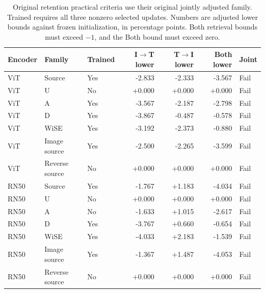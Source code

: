 \begin{table}[t]
\centering
\small
\setlength{\tabcolsep}{3pt}
\begin{tabular}{lllrrrl}
\toprule
Encoder & Family & Trained & I$\to$T lower & T$\to$I lower & Both lower & Joint\\
\midrule
ViT & Source & Yes & -2.833 & -2.333 & -3.567 & Fail\\
ViT & U & No & +0.000 & +0.000 & +0.000 & Fail\\
ViT & A & Yes & -3.567 & -2.187 & -2.798 & Fail\\
ViT & D & Yes & -3.867 & -0.487 & -0.578 & Fail\\
ViT & WiSE & Yes & -3.192 & -2.373 & -0.880 & Fail\\
ViT & Image source & Yes & -2.500 & -2.265 & -3.599 & Fail\\
ViT & Reverse source & No & +0.000 & +0.000 & +0.000 & Fail\\
RN50 & Source & Yes & -1.767 & +1.183 & -4.034 & Fail\\
RN50 & U & No & +0.000 & +0.000 & +0.000 & Fail\\
RN50 & A & No & -1.633 & +1.015 & -2.617 & Fail\\
RN50 & D & Yes & -3.767 & +0.660 & -0.654 & Fail\\
RN50 & WiSE & Yes & -4.033 & +2.183 & -1.539 & Fail\\
RN50 & Image source & Yes & -1.367 & +1.487 & -4.053 & Fail\\
RN50 & Reverse source & No & +0.000 & +0.000 & +0.000 & Fail\\
\bottomrule
\end{tabular}
\caption{Original retention practical criteria use their original jointly adjusted family. Trained requires all three nonzero selected updates. Numbers are adjusted lower bounds against frozen initialization, in percentage points. Both retrieval bounds must exceed $-1$, and the Both bound must exceed zero.}\label{tab:originalgates}
\end{table}


